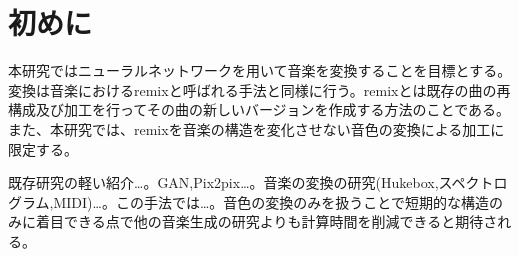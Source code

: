 \chapter{初めに}

本研究ではニューラルネットワークを用いて音楽を変換することを目標とする。変換は音楽におけるremixと呼ばれる手法と同様に行う。remixとは既存の曲の再構成及び加工を行ってその曲の新しいバージョンを作成する方法のことである。また、本研究では、remixを音楽の構造を変化させない音色の変換による加工に限定する。

既存研究の軽い紹介…。GAN,Pix2pix…。音楽の変換の研究(Hukebox,スペクトログラム,MIDI)…。この手法では…。音色の変換のみを扱うことで短期的な構造のみに着目できる点で他の音楽生成の研究よりも計算時間を削減できると期待される。
~\cite{Jukebox}